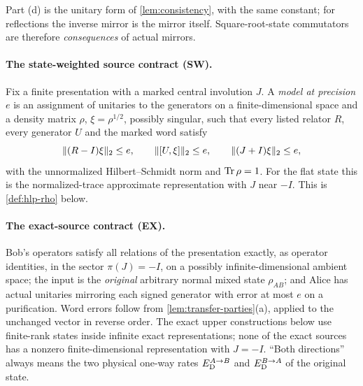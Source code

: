 Part (d) is the unitary form of \cref{lem:consistency}, with the same constant; for reflections the inverse mirror is the
mirror itself. Square-root-state commutators are therefore \emph{consequences} of actual mirrors.

\paragraph{The state-weighted source contract (SW).} Fix a finite presentation with a marked central involution $J$.
A \emph{model at precision $e$} is an assignment of unitaries to the generators on a finite-dimensional space and a
density matrix $\rho$, $\xi=\rho^{1/2}$, possibly singular, such that every listed relator $R$, every generator $U$ and
the marked word satisfy
\[
\lVert (R-I)\xi\rVert_2\le e,\qquad\lVert [U,\xi]\rVert_2\le e,\qquad\lVert (J+I)\xi\rVert_2\le e,
\]
with the unnormalized Hilbert--Schmidt norm and $\operatorname{Tr}\rho=1$. For the flat state this is the normalized-trace
approximate representation with $J$ near $-I$. This is \cref{def:hlp-rho} below.

\paragraph{The exact-source contract (EX).} Bob's operators satisfy all relations of the presentation exactly, as operator
identities, in the sector $\pi(J)=-I$, on a possibly infinite-dimensional ambient space; the input is the
\emph{original} arbitrary normal mixed state $\rho_{AB}$; and Alice has actual unitaries mirroring each signed generator
with error at most $e$ on a purification. Word errors follow from \cref{lem:transfer-parties}(a), applied to the unchanged
vector in reverse order. The exact upper constructions below use finite-rank states inside infinite exact
representations; none of the exact sources has a nonzero finite-dimensional representation with $J=-I$. ``Both
directions'' always means the two physical one-way rates $E_{\mathrm D}^{A\to B}$ and $E_{\mathrm D}^{B\to A}$ of the original state.
